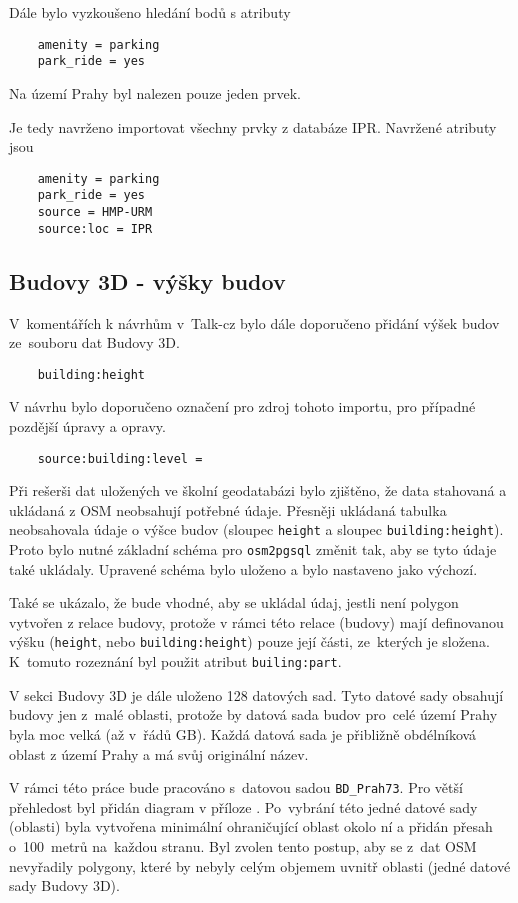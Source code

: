 Dále bylo vyzkoušeno hledání bodů s atributy
\begin{verbatim}
    amenity = parking
    park_ride = yes
\end{verbatim}
Na území Prahy byl nalezen pouze jeden prvek.

Je tedy navrženo importovat všechny prvky z databáze IPR.
Navržené atributy jsou
\begin{verbatim}
    amenity = parking
    park_ride = yes
    source = HMP-URM
    source:loc = IPR
\end{verbatim}


\subsection{Budovy 3D - výšky budov}
\label{Budovy 3D - výšky budov}
V~komentářích k návrhům v~Talk-cz bylo dále doporučeno přidání
výšek budov ze~souboru dat Budovy 3D.
\begin{verbatim}
    building:height
\end{verbatim}
V návrhu bylo doporučeno označení pro zdroj tohoto importu, pro případné pozdější úpravy a opravy.
\begin{verbatim}
    source:building:level =
\end{verbatim}

Při rešerši dat uložených ve školní geodatabázi bylo zjištěno,
že data stahovaná a ukládaná z OSM neobsahují potřebné údaje.
Přesněji ukládaná tabulka neobsahovala údaje o výšce budov
(sloupec {\tt height} a sloupec {\tt building\::height}).
Proto bylo nutné základní schéma pro {\tt osm2pgsql} změnit tak, aby se tyto údaje také 
ukládaly. Upravené schéma bylo uloženo a bylo nastaveno jako výchozí.

Také se ukázalo, že bude vhodné, aby se ukládal údaj, jestli
není polygon vytvořen z relace budovy, protože v rámci této relace
(budovy) mají definovanou výšku ({\tt height}, nebo
{\tt building\::height}) pouze její části, ze~kterých je složena.
K~tomuto rozeznání byl použit atribut {\tt builing\::part}.

V sekci Budovy 3D je dále uloženo 128 datových sad. Tyto datové sady obsahují budovy jen z~malé oblasti, protože
by datová sada budov pro~celé území Prahy byla moc velká (až v~řádů
GB). Každá datová sada je přibližně obdélníková oblast z území Prahy a
má svůj originální název.

V rámci této práce bude pracováno s~datovou sadou {\tt BD\_Prah73}.
Pro větší přehledost byl přidán diagram v příloze .
Po~vybrání této jedné datové sady (oblasti) byla
vytvořena minimální ohraničující oblast okolo ní a přidán přesah
o~100~metrů na~každou stranu. Byl zvolen tento postup, aby se z~dat
OSM nevyřadily polygony, které by nebyly celým objemem uvnitř oblasti (jedné datové sady Budovy 3D).

